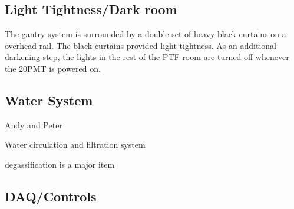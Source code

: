 













\subsection{Light Tightness/Dark room}

The gantry system is surrounded by a double set of heavy black
curtains on a overhead rail.  The black curtains provided light tightness.
As an additional darkening step, the lights in the rest of the PTF room
are turned off whenever the 20\" PMT is powered on.


\subsection{Water System}
Andy and Peter

Water circulation and filtration system

degassification is a major item


\subsection{DAQ/Controls}
\label{Sec:DAQ_Controls}

